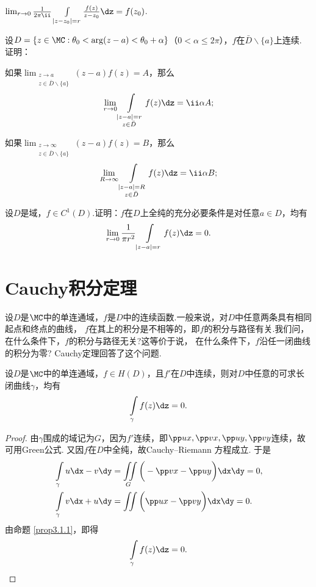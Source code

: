 \begin{xiti}
\begin{enuma}
    \item $\lim_{r\to0}\frac1{2\pi\ii}\int\limits_{|z-z_0|=r}\frac{f(z)}{z-z_0}\dz=f(z_0)$.
  \end{enuma}
\item 设$D=\{z\in\MC:\theta_0<\arg(z-a)<\theta_0+\alpha\}$（$0<\alpha\le2\pi$），$f$在$\bar D\backslash\{a\}$上连续. 证明：
\begin{enuma}
  \item 如果$\lim_{\substack{z\to a\\z\in\bar D\backslash\{a\}}}(z-a)f(z)=A$，那么
  \[\lim_{r\to0}\int\limits_{\substack{|z-a|=r\\z\in\bar D}}f(z)\dz=\ii\alpha A;\]
  \item 如果$\lim_{\substack{z\to \infty\\z\in\bar D\backslash\{a\}}}(z-a)f(z)=B$，那么
  \[\lim_{R\to\infty}\int\limits_{\substack{|z-a|=R\\z\in \bar D}}f(z)\dz=\ii\alpha B;\]
\end{enuma}
\item 设$D$是域，$f\in C^1(D)$.证明：$f$在$D$上全纯的充分必要条件是对任意$a\in D$，均有
\[\lim_{r\to0}\frac1{\pi r^2}\int\limits_{|z-a|=r}f(z)\dz=0.\]
\end{xiti}

\section{Cauchy积分定理\label{sec3.2}}
设$D$是$\MC$中的单连通域，$f$是$D$中的连续函数.一般来说，对$D$中任意两条具有相同起点和终点的曲线，
$f$在其上的积分是不相等的，即$f$的积分与路径有关.我们问，在什么条件下，$f$的积分与路径无关?这等价于说，
在什么条件下，$f$沿任一闭曲线的积分为零? Cauchy定理回答了这个问题.
\begin{theorem}\label{thm3.2.1}
设$D$是$\MC$中的单连通域，$f\in H(D)$，且$f'$在$D$中连续，则对$D$中任意的可求长闭曲线$\gamma$，均有
\[\int\limits_\gamma f(z)\dz=0.\]
\end{theorem}
\begin{proof}
由$\gamma$围成的域记为$G$，因为$f'$连续，即$\pp ux,\pp vx,\pp uy,\pp vy$连续，故可用Green公式.
又因$f$在$D$中全纯，故Cauchy--Riemann 方程成立. 于是
\begin{align*}
&\int\limits_\gamma u\dx-v\dy=\iint\limits_G\bigg(-\pp vx-\pp uy\bigg)\dx\dy=0,\\
&\int\limits_\gamma v\dx+u\dy=\iint\limits\bigg(\pp ux-\pp vy\bigg)\dx\dy=0.
\end{align*}
由命题 \ref{prop3.1.1}，即得
\begin{equation*}
  \int\limits_\gamma f(z)\dz=0.
\end{equation*}
\end{proof}

